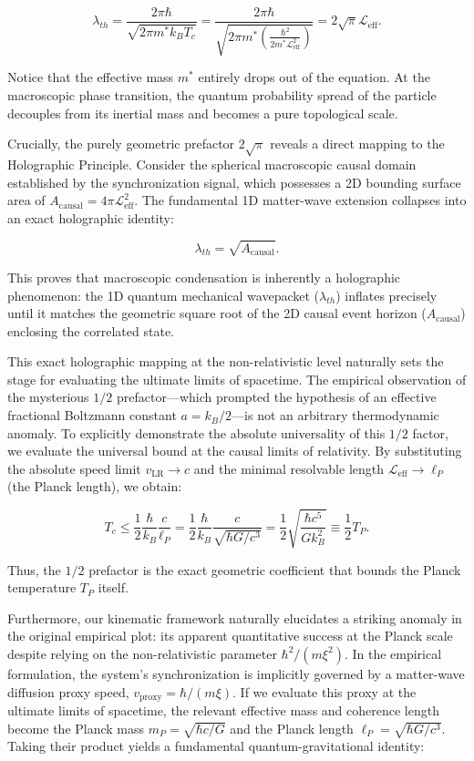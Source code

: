 \documentclass[11pt,a4paper]{article}
\begin{document}
$$\lambda_{th} = \frac{2\pi\hbar}{\sqrt{2\pi m^* k_B T_c}} = \frac{2\pi\hbar}{\sqrt{2\pi m^* \left( \frac{\hbar^2}{2m^*\mathcal{L}_{\text{eff}}^2} \right) }} = 2\sqrt{\pi}\mathcal{L}_{\text{eff}}.$$

Notice that the effective mass $m^*$ entirely drops out of the equation. At the macroscopic phase transition, the quantum probability spread of the particle decouples from its inertial mass and becomes a pure topological scale.

Crucially, the purely geometric prefactor $2\sqrt{\pi}$ reveals a direct mapping to the Holographic Principle. Consider the spherical macroscopic causal domain established by the synchronization signal, which possesses a 2D bounding surface area of $A_{\text{causal}} = 4\pi\mathcal{L}_{\text{eff}}^2$. The fundamental 1D matter-wave extension collapses into an exact holographic identity:

$$\lambda_{th} = \sqrt{A_{\text{causal}}}.$$

This proves that macroscopic condensation is inherently a holographic phenomenon: the 1D quantum mechanical wavepacket ($\lambda_{th}$) inflates precisely until it matches the geometric square root of the 2D causal event horizon ($A_{\text{causal}}$) enclosing the correlated state.

This exact holographic mapping at the non-relativistic level naturally sets the stage for evaluating the ultimate limits of spacetime. The empirical observation of the mysterious $1/2$ prefactor—which prompted the hypothesis of an effective fractional Boltzmann constant $a = k_B/2$—is not an arbitrary thermodynamic anomaly. To explicitly demonstrate the absolute universality of this $1/2$ factor, we evaluate the universal bound at the causal limits of relativity. By substituting the absolute speed limit $v_{\text{LR}} \to c$ and the minimal resolvable length $\mathcal{L}_{\text{eff}} \to \ell_P$ (the Planck length), we obtain:

$$T_c \le \frac{1}{2}\frac{\hbar}{k_B}\frac{c}{\ell_P} = \frac{1}{2}\frac{\hbar}{k_B}\frac{c}{\sqrt{\hbar G/c^3}} = \frac{1}{2}\sqrt{\frac{\hbar c^5}{G k_B^2}} \equiv \frac{1}{2}T_P.$$

Thus, the $1/2$ prefactor is the exact geometric coefficient that bounds the Planck temperature $T_P$ itself.

Furthermore, our kinematic framework naturally elucidates a striking anomaly in the original empirical plot: its apparent quantitative success at the Planck scale despite relying on the non-relativistic parameter $\hbar^2/(m \xi^2)$. In the empirical formulation, the system's synchronization is implicitly governed by a matter-wave diffusion proxy speed, $v_{\text{proxy}} = \hbar / (m \xi)$. If we evaluate this proxy at the ultimate limits of spacetime, the relevant effective mass and coherence length become the Planck mass $m_P = \sqrt{\hbar c / G}$ and the Planck length $\ell_P = \sqrt{\hbar G / c^3}$. Taking their product yields a fundamental quantum-gravitational identity:
\end{document}
